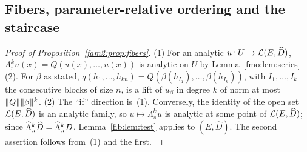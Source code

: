 \subsection{Fibers, parameter-relative ordering and the staircase}\label{fmo:ssec:mixed}

\begin{proof}[Proof of Proposition~\ref{fam2:prop:fibers}]
(1) For an analytic $u\colon U\to\mathcal L(E,\widehat D)$, $\Lambda^k_\pi u(x)=Q(u(x),\dots,u(x))$ is analytic on $U$ by
Lemma~\ref{fmo:lem:series}(2). For $\beta$ as stated, $q(h_1,\dots,h_{kn})=Q(\beta(h_{I_1}),\dots,\beta(h_{I_k}))$, with
$I_1,\dots,I_k$ the consecutive blocks of size $n$, is a lift of $u_\beta$ in degree $k$ of norm at most
$\lVert Q\rVert\lVert \beta\rVert^k$. (2) The ``if'' direction is~(1). Conversely, the identity of the open set $\mathcal L(E,\widehat D)$ is an
analytic family, so $u\mapsto\Lambda^k_\pi u$ is analytic at some point of $\mathcal L(E,\widehat D)$; since
$\widehat\Lambda^k_\pi\widehat D=\widehat\Lambda^k_\pi D$, Lemma~\ref{fib:lem:test} applies to $(E,\widehat D)$. The second assertion
follows from~(1) and the first.
\end{proof}

